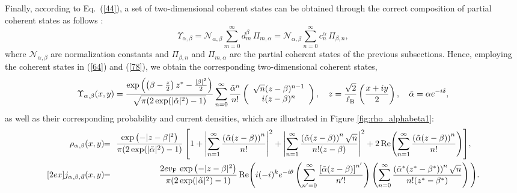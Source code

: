 \documentclass[aps,showpacs,showkeys]{revtex4}
\begin{document}
Finally, according to Eq.~(\ref{44}), a set of two-dimensional coherent states can be obtained through the correct composition of partial coherent states as follows \cite{d17,dosr20}:
\begin{equation}\label{83}
\Upsilon_{\alpha,\beta}=\mathcal{N}_{\alpha,\beta} \sum_{m=0}^{\infty}d_m^\beta\, \Pi_{m,\alpha}=\mathcal{N}_{\alpha,\beta} \sum_{n=0}^{\infty}c_n^\alpha\, \Pi_{\beta,n},
\end{equation}where $\mathcal{N}_{\alpha,\beta}$ are normalization constants and $\Pi_{\beta,n}$ and $\Pi_{m,\alpha}$ are the partial coherent states of the previous subsections.
Hence, employing the coherent states in (\ref{64}) and (\ref{78}), we obtain the corresponding two-dimensional coherent states,
\begin{equation}\label{84a}
\Upsilon_{\alpha,\beta}(x,y)=\frac{\exp\left(\left(\beta-\frac{z}{2}\right)z^\ast-\frac{\vert\beta\vert^2}{2}\right)}{\sqrt{\pi(2\exp(\vert\tilde{\alpha}\vert^2)-1)}}\sum_{n=0}^{\infty}\frac{\tilde{\alpha}^n}{n!}\left(\begin{array}{c}
	\sqrt{n}(z-\beta)^{n-1}\\
	i(z-\beta)^{n}
	\end{array}\right),\quad z= \frac{\sqrt{2}}{\ell_{\rm B}} \left(\frac{x+iy}{2}\right),\quad \tilde{\alpha}=\alpha e^{-i\delta},
\end{equation}
as well as their corresponding probability and current densities, which are illustrated in Figure \ref{fig:rho_alphabeta1}:
\begin{eqnarray}
 	\rho_{\alpha,\beta}(x,y)\!&\!=\!&\! \frac{\exp\left(-\vert z-\beta\vert^2\right)}{\pi(2\exp(\vert\tilde{\alpha}\vert^2)-1)}\left[1+\left\vert\sum_{n=1}^{\infty}\frac{\left(\tilde{\alpha}(z-\beta)\right)^n}{n!}\right\vert^2+\left\vert\sum_{n=1}^{\infty}\frac{\left(\tilde{\alpha}(z-\beta)\right)^n\sqrt{n}}{n!(z-\beta)}\right\vert^2
 +2\, \textrm{Re}\!\left(\sum_{n=1}^{\infty}\frac{\left(\tilde{\alpha}(z-\beta)\right)^n}{n!}\right) \right]\!, \quad 
 \label{84b} 
 \\ [2ex]
 	j_{\alpha,\beta,\vec{u}}(x,y)\!&\!=\!&\! \frac{2ev_{\rm F}\,\exp\left(-\vert z-\beta\vert^2\right)}{\pi(2\exp(\vert\tilde{\alpha}\vert^2)-1)}\, \textrm{Re}\Bigg( i(-i)^{k}e^{-i\theta}\left(\sum_{n'=0}^{\infty}\frac{\left[\tilde{\alpha}(z-\beta)\right]^{n'}}{n'!}\right)  \left(\sum_{n=0}^{\infty}\frac{\left(\tilde{\alpha}^\ast(z^\ast-\beta^\ast)\right)^n\sqrt{n}}{n!(z^\ast-\beta^\ast)}\right)\Bigg).
	\label{84c}
	\end{eqnarray}
\end{document}
